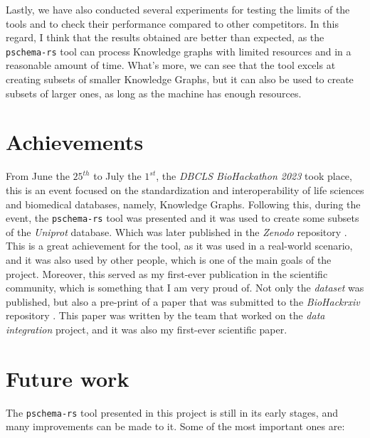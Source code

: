 Lastly, we have also conducted several experiments for testing the limits of the tools and to check their performance compared to other competitors. In this regard, I think that the results obtained are better than expected, as the \texttt{pschema-rs} tool can process Knowledge graphs with limited resources and in a reasonable amount of time. What's more, we can see that the tool excels at creating subsets of smaller Knowledge Graphs, but it can also be used to create subsets of larger ones, as long as the machine has enough resources.

\section{Achievements}

From June the $25^{th}$ to July the $1^{st}$, the \textit{DBCLS BioHackathon 2023} took place, this is an event focused on the standardization and interoperability of life sciences and biomedical databases, namely, Knowledge Graphs. Following this, during the event, the \texttt{pschema-rs} tool was presented and it was used to create some subsets of the \textit{Uniprot} database. Which was later published in the \textit{Zenodo} repository \cite{angel_iglesias_prestamo_2023_8086938}. This is a great achievement for the tool, as it was used in a real-world scenario, and it was also used by other people, which is one of the main goals of the project. Moreover, this served as my first-ever publication in the scientific community, which is something that I am very proud of. Not only the \textit{dataset} was published, but also a pre-print of a paper that was submitted to the \textit{BioHackrxiv} repository \cite{labra-gayo_waagmeester_yamamoto_iglesias-préstamo_katayama_liener_unni_bolleman_aoki-kinoshita_yokochi_et}. This paper was written by the team that worked on the \textit{data integration} project, and it was also my first-ever scientific paper.

\section{Future work}

The \texttt{pschema-rs} tool presented in this project is still in its early stages, and many improvements can be made to it. Some of the most important ones are:

